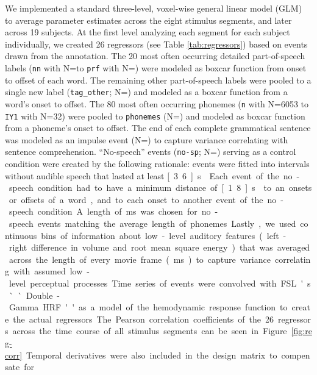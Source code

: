 \documentclass[10pt,a4paper,onecolumn]{article}
\begin{document}
We implemented a standard three-level, voxel-wise general linear model (GLM) to
average parameter estimates across the eight stimulus segments, and later across
19 subjects.
At the first level analyzing each segment for each subject individually, we
created 26 regressors (see Table \ref{tab:regressors}) based on events drawn
from the annotation.
The 20 most often occurring detailed part-of-speech labels (\texttt{nn} with
N=\rNnAll\space to \texttt{prf} with N=\rPrfAll) were modeled as boxcar function
from onset to offset of each word.
The remaining other part-of-speech labels were pooled to a single new label
(\texttt{tag\_other}; N=\rTagotherAll) and modeled as a boxcar function from a
word's onset to offset.
The 80 most often occurring phonemes (\texttt{n} with N=6053 to \texttt{IY1}
with N=32) were pooled to \texttt{phonemes} (N=\rPhonesAll) and modeled as
boxcar function from a phoneme's onset to offset.
The end of each complete grammatical sentence was modeled as an impulse event
(N=\rSentenceAll) to capture variance correlating with sentence comprehension.
``No-speech'' events (\texttt{no-sp}; N=\rNospAll) serving as a control
condition were created by the following rationale: events were fitted into
intervals without audible speech that lasted at least \unit[3.6]{s} .
Each event of the no-speech condition had to have a minimum distance of
\unit[1.8]{s} to an onsets or offsets of a word, and to each onset to another
event of the no-speech condition.
A length of \unit[70]{ms} was chosen for no-speech events matching the average
length of phonemes.
Lastly, we used continuous bins of information about low-level auditory features
(left-right difference in volume and root mean square energy) that was averaged
across the length of every movie frame (\unit[40]{ms}) to capture variance
correlating with assumed low-level perceptual processes.
Time series of events were convolved with FSL's ``Double-Gamma HRF'' as a model
of the hemodynamic response function to create the actual regressors.
The Pearson correlation coefficients of the 26 regressors across the time course
of all stimulus segments can be seen in Figure \ref{fig:reg-corr}.
Temporal derivatives were also included in the design matrix to compensate for
\end{document}
